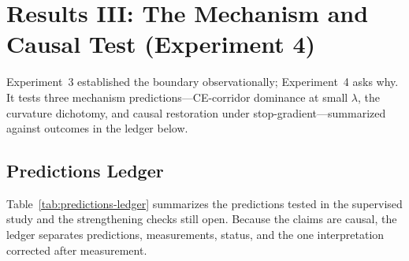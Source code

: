 \section{Results III: The Mechanism and Causal Test (Experiment 4)}
\label{sec:mechanism}
Experiment~3 established the boundary observationally; Experiment~4 asks why.
It tests three mechanism predictions---CE-corridor dominance at small
$\lambda$, the curvature dichotomy, and causal restoration under
stop-gradient---summarized against outcomes in the ledger below.

\subsection{Predictions Ledger}
Table~\ref{tab:predictions-ledger} summarizes the predictions tested in the
supervised study and the strengthening checks still open. Because the claims
are causal, the ledger separates predictions, measurements, status, and the
one interpretation corrected after measurement.
